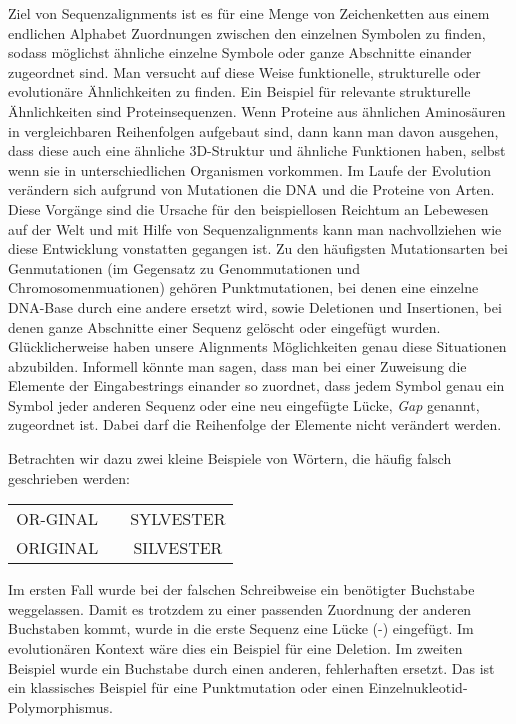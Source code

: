 Ziel von Sequenzalignments ist es für eine Menge von Zeichenketten aus einem endlichen Alphabet Zuordnungen zwischen den einzelnen Symbolen zu finden, sodass möglichst ähnliche einzelne Symbole oder ganze Abschnitte einander zugeordnet sind. Man versucht auf diese Weise funktionelle, strukturelle oder evolutionäre Ähnlichkeiten zu finden. Ein Beispiel für relevante strukturelle Ähnlichkeiten sind Proteinsequenzen. Wenn Proteine aus ähnlichen Aminosäuren in vergleichbaren Reihenfolgen aufgebaut sind, dann kann man davon ausgehen, dass diese auch eine ähnliche 3D-Struktur und ähnliche Funktionen haben, selbst wenn sie in unterschiedlichen Organismen vorkommen. Im Laufe der Evolution verändern sich aufgrund von Mutationen die DNA und die Proteine von Arten. Diese Vorgänge sind die Ursache für den beispiellosen Reichtum an Lebewesen auf der Welt und mit Hilfe von Sequenzalignments kann man nachvollziehen wie diese Entwicklung vonstatten gegangen ist. Zu den häufigsten Mutationsarten bei Genmutationen (im Gegensatz zu Genommutationen und Chromosomenmuationen) gehören Punktmutationen, bei denen eine einzelne DNA-Base durch eine andere ersetzt wird, sowie Deletionen und Insertionen, bei denen ganze Abschnitte einer Sequenz gelöscht oder eingefügt wurden. Glücklicherweise haben unsere Alignments Möglichkeiten genau diese Situationen abzubilden. Informell könnte man sagen, dass man bei einer Zuweisung die Elemente der Eingabestrings einander so zuordnet, dass jedem Symbol genau ein Symbol jeder anderen Sequenz oder eine neu eingefügte Lücke, \emph{Gap} genannt, zugeordnet ist. Dabei darf die Reihenfolge der Elemente nicht verändert werden.

Betrachten wir dazu zwei kleine Beispiele von Wörtern, die häufig falsch geschrieben werden:

\ttfamily
\begin{center}
\begin{tabular}{ccc}
		OR-GINAL & \hspace{2cm} & SYLVESTER \\
		ORIGINAL & \hspace{2cm} & SILVESTER
\end{tabular}
\end{center}
\normalfont

Im ersten Fall wurde bei der falschen Schreibweise ein benötigter Buchstabe weggelassen. Damit es trotzdem zu einer passenden Zuordnung der anderen Buchstaben kommt, wurde in die erste Sequenz eine Lücke (-) eingefügt. Im evolutionären Kontext wäre dies ein Beispiel für eine Deletion. Im zweiten Beispiel wurde ein Buchstabe durch einen anderen, fehlerhaften ersetzt. Das ist ein klassisches Beispiel für eine Punktmutation oder einen Einzelnukleotid-Polymorphismus.


